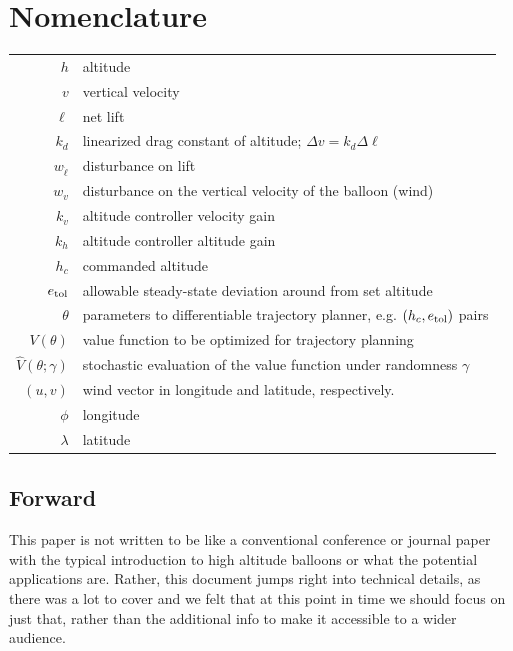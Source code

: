 \documentclass[11pt]{scrartcl} %
\begin{document}
\newcommand{\cf}{{\it cf.}}
\newcommand{\eg}{{\it e.g.}}
\newcommand{\ie}{{\it i.e.}}
\newcommand{\etc}{{\it etc.}}

\tableofcontents

\section*{Nomenclature}
\begin{tabular}{rl}
$h$ & altitude  \\
$v$ & vertical velocity\\
$\ell$ & net lift \\
$k_d$ & linearized drag constant of altitude; $\Delta v =k_d \Delta \ell$\\
$w_{\dot \ell}$ & disturbance on lift \\
$w_{v}$ & disturbance on the vertical velocity of the balloon (wind) \\
$k_v$ & altitude controller velocity gain \\
$k_h$ & altitude controller altitude gain \\
$h_c$ & commanded altitude \\
$e_{\mathrm{tol}}$ & allowable steady-state deviation around from set altitude \\ 
$\theta$ & parameters to differentiable trajectory planner, e.g. $(h_c,e_{\mathrm{tol}})$ pairs\\
$V(\theta)$ & value function to be optimized for trajectory planning \\
$\hat V(\theta; \gamma)$ & stochastic evaluation of the value function under randomness $\gamma$ \\
$(u,v)$ & wind vector in longitude and latitude, respectively.\\
$\phi$ & longitude \\
$\lambda$ & latitude \\
\end{tabular}

\subsection*{Forward}

This paper is not written to be like a conventional conference or journal paper with the typical introduction to high altitude balloons or what the potential applications are. Rather, this document jumps right into technical details, as there was a lot to cover and we felt that at this point in time we should focus on just that, rather than the additional info to make it accessible to a wider audience.
\end{document}
